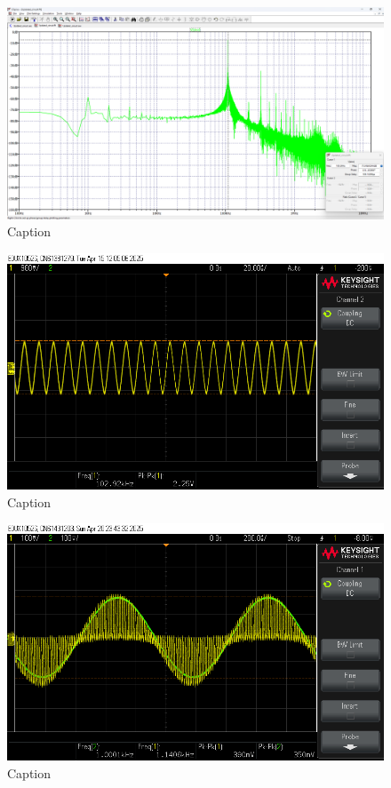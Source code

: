 \documentclass[conference]{IEEEtran}
\begin{document}
\begin{figure}
    \centering
    \includegraphics[width=1\linewidth]{Images/fft_sine_osc.png}
    \caption{Caption}
\end{figure}

\begin{figure}
    \centering
    \includegraphics[width=1\linewidth]{Images/osc_circuit_out.png}
    \caption{Caption}
\end{figure}

\begin{figure}
    \centering
    \includegraphics[width=1\linewidth]{Images/modulated_out_circuit.png}
    \caption{Caption}
\end{figure}
\end{document}
